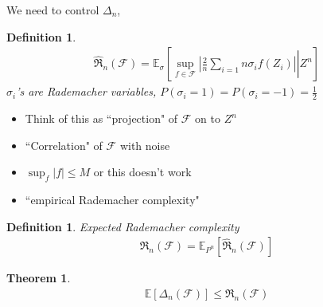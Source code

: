 \documentclass[10pt]{article}
\newcounter{lecnum}
\newtheorem{theorem}{Theorem}[lecnum]
\newtheorem{definition}[def]{Definition}
\newcommand{\F}{\mathcal{F}}
\newcommand{\Expect}[1]{\mathbb{E}\!\left[#1\right]}
\newcommand{\Radn}{\hat{\mathfrak R}_n}
\newcommand{\Rad}{\mathfrak R_n}
\renewcommand{\hat}{\widehat}
\begin{document}
We need to control $\Delta_n$,

\begin{definition}
\begin{align}
\Radn (\F) = \mathbb{E}_\sigma\left[\left. \sup_{f\in\mathcal{F}} | \frac{2}{n} \sum_{i=1}{n} \sigma_i f(Z_i)| \right| Z^n\right]
\end{align}
$\sigma_i$'s are Rademacher variables, $P(\sigma_i = 1) = P(\sigma_i = -1) = \frac{1}{2}$
\end{definition}

\begin{itemize}
\item Think of this as ``projection" of $\F$ on to $Z^n$
\item ``Correlation" of $\F$ with noise
\item $\sup_f|f| \le M$ or this doesn't work
\item ``empirical Rademacher complexity"
\end{itemize}

\begin{definition}
Expected Rademacher complexity
\begin{align*}
\Rad(\F) = \mathbb{E}_{P^n} \left[ \Radn (\F) \right]
\end{align*}
\end{definition}

\begin{theorem}
\begin{align*}
\Expect{\Delta_n(\F)} \le \Rad (\F)
\end{align*}
\end{theorem}
\end{document}
